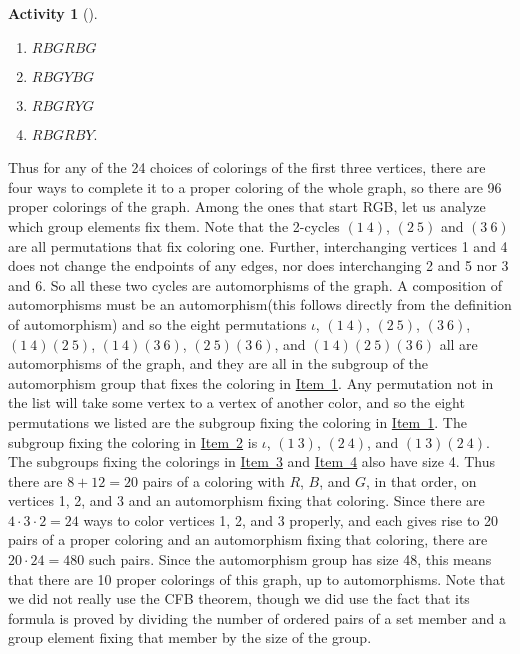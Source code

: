 \documentclass[10pt,]{book}
\theoremstyle{plain}
\theoremstyle{definition}
\newtheorem{activity}[project]{Activity}
\numberwithin{equation}{chapter}
\begin{document}
\begin{activity}[]
\begin{enumerate}
\item\hypertarget{coloring1}{}\(RBGRBG\)%
\item\hypertarget{coloring2}{}\(RBGYBG\)%
\item\hypertarget{coloring3}{}\(RBGRYG\)%
\item\hypertarget{coloring4}{}\(RBGRBY\).%
\end{enumerate}
 Thus for any of the 24 choices of colorings of the first three vertices, there are four ways to complete it to a proper coloring of the whole graph, so there are 96 proper colorings of the graph. Among the ones that start RGB, let us analyze which group elements fix them. Note that the 2-cycles \((1\ 4)\), \((2\ 5)\) and \((3\ 6)\) are all permutations that fix coloring one. Further, interchanging vertices 1 and 4 does not change the endpoints of any edges, nor does interchanging 2 and 5 nor 3 and 6. So all these two cycles are automorphisms of the graph. A composition of automorphisms must be an automorphism(this follows directly from the definition of automorphism) and so the eight permutations \(\iota\), \((1\ 4)\), \((2\ 5)\), \((3\ 6)\), \((1\ 4)(2\ 5)\), \((1\ 4)
(3\ 6)\), \((2\ 5)(3\ 6)\), and \((1\ 4)(2\ 5)(3\ 6)\) all are automorphisms of the graph, and they are all in the subgroup of the automorphism group that fixes the coloring in \hyperlink{coloring1}{Item~1}. Any permutation not in the list will take some vertex to a vertex of another color, and so the eight permutations we listed are the subgroup fixing the coloring in \hyperlink{coloring1}{Item~1}. The subgroup fixing the coloring in \hyperlink{coloring2}{Item~2} is \(\iota\), \((1\ 3)\), \((2\ 4)\), and \((1\ 3)(2\ 4)\). The subgroups fixing the colorings in \hyperlink{coloring3}{Item~3} and \hyperlink{coloring4}{Item~4} also have size 4. Thus there are \(8+12=20\) pairs of a coloring with \(R\), \(B\), and \(G\), in that order, on vertices 1, 2, and 3 and an automorphism fixing that coloring. Since there are \(4\cdot3\cdot2=24\) ways to color vertices 1, 2, and 3 properly, and each gives rise to 20 pairs of a proper coloring and an automorphism fixing that coloring, there are \(20\cdot24=480\) such pairs. Since the automorphism group has size 48, this means that there are 10 proper colorings of this graph, up to automorphisms. Note that we did not really use the CFB theorem, though we did use the fact that its formula is proved by dividing the number of ordered pairs of a set member and a group element fixing that member by the size of the group.%
\end{activity}
\typeout{************************************************}
\typeout{************************************************}
\end{document}
